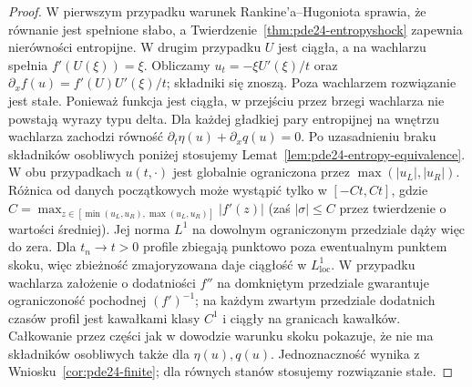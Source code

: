 \begin{proof}
W pierwszym przypadku warunek Rankine'a--Hugoniota
sprawia, że równanie jest spełnione słabo, a
Twierdzenie~\ref{thm:pde24-entropyshock} zapewnia
nierówności entropijne. W drugim przypadku $U$ jest
ciągła, a na wachlarzu spełnia $f'(U(\xi))=\xi$.
Obliczamy $u_t=-\xi U'(\xi)/t$ oraz
$\partial_x f(u)=f'(U)U'(\xi)/t$; składniki się znoszą.
Poza wachlarzem rozwiązanie jest stałe. Ponieważ funkcja
jest ciągła, w przejściu przez brzegi wachlarza nie
powstają wyrazy typu delta. Dla każdej gładkiej pary entropijnej
na wnętrzu wachlarza zachodzi równość
$\partial_t\eta(u)+\partial_xq(u)=0$.
Po uzasadnieniu braku składników osobliwych poniżej
stosujemy Lemat~\ref{lem:pde24-entropy-equivalence}.
W obu przypadkach $u(t,\cdot)$ jest globalnie ograniczona
przez $\max(|u_L|,|u_R|)$. Różnica od danych początkowych
może wystąpić tylko w $[-Ct,Ct]$, gdzie
$C=\max_{z\in[\min(u_L,u_R),\max(u_L,u_R)]}|f'(z)|$
(zaś $|\sigma|\le C$ przez twierdzenie o wartości średniej).
Jej norma $L^1$ na dowolnym ograniczonym przedziale
dąży więc do zera. Dla $t_n\to t>0$ profile zbiegają
punktowo poza ewentualnym punktem skoku, więc zbieżność
zmajoryzowana daje ciągłość w $L^1_{\mathrm{loc}}$.
W przypadku wachlarza założenie o dodatniości $f''$
na domkniętym przedziale gwarantuje ograniczoność
pochodnej $(f')^{-1}$; na każdym zwartym przedziale
dodatnich czasów profil jest kawałkami klasy $C^1$
i ciągły na granicach kawałków. Całkowanie przez części
jak w dowodzie warunku skoku pokazuje, że nie ma
składników osobliwych także dla $\eta(u),q(u)$.
Jednoznaczność wynika z Wniosku~\ref{cor:pde24-finite};
dla równych stanów stosujemy rozwiązanie stałe.
\end{proof}


